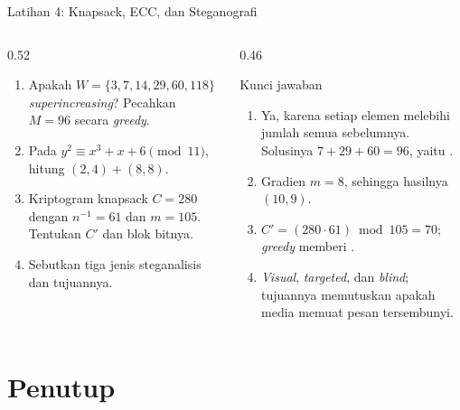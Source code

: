 \documentclass[aspectratio=169,11pt]{beamer}
\begin{document}
\begin{frame}{Latihan 4: Knapsack, ECC, dan Steganografi}
    \scriptsize
    \begin{columns}[T,onlytextwidth]
        \begin{column}{0.52\textwidth}
            \begin{enumerate}
                \setlength{\itemsep}{4pt}
                \item Apakah $W=\{3,7,14,29,60,118\}$ \textit{superincreasing}?
                      Pecahkan $M=96$ secara \textit{greedy}.
                \item Pada $y^{2}\equiv x^{3}+x+6\pmod{11}$, hitung
                      $(2,4)+(8,8)$.
                \item Kriptogram knapsack $C=280$ dengan $n^{-1}=61$ dan
                      $m=105$. Tentukan $C'$ dan blok bitnya.
                \item Sebutkan tiga jenis steganalisis dan tujuannya.
            \end{enumerate}
        \end{column}
        \begin{column}{0.46\textwidth}
            \begin{block}{Kunci jawaban}
                \begin{enumerate}
                    \setlength{\itemsep}{3pt}
                    \item Ya, karena setiap elemen melebihi jumlah semua
                          sebelumnya. Solusinya $7+29+60=96$, yaitu
                          .
                    \item Gradien $m=8$, sehingga hasilnya $(10,9)$.
                    \item $C'=(280\cdot61)\bmod105=70$; \textit{greedy} memberi
                          .
                    \item \textit{Visual}, \textit{targeted}, dan
                          \textit{blind}; tujuannya memutuskan apakah media
                          memuat pesan tersembunyi.
                \end{enumerate}
            \end{block}
        \end{column}
    \end{columns}
\end{frame}

\section{Penutup}
\end{document}
